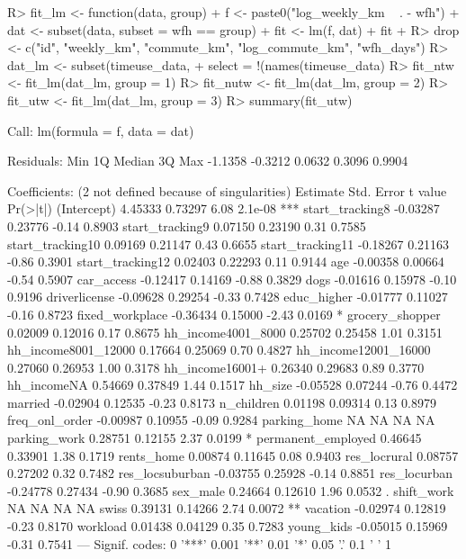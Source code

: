 \documentclass[%
    twoside, openright, titlepage, numbers=noenddot,%
    cleardoublepage=empty,%
    abstract=false,%
    BCOR=5.5mm, paper=a5, fontsize=10pt,%
]{scrreprt}
\begin{document}
%
\begin{Schunk}
\begin{Sinput}
R> fit_lm <- function(data, group) {
+    f <- paste0("log_weekly_km ~ . - wfh")
+    dat <- subset(data, subset = wfh == group)
+    fit <- lm(f, dat)
+    fit
+  }
R> drop <- c("id", "weekly_km", "commute_km", "log_commute_km", "wfh_days")
R> dat_lm <- subset(timeuse_data,
+    select = !(names(timeuse_data) %in% drop) & !grepl("^isco_", names(timeuse_data)))
R> fit_ntw <- fit_lm(dat_lm, group = 1)
R> fit_nutw <- fit_lm(dat_lm, group = 2)
R> fit_utw <- fit_lm(dat_lm, group = 3)
R> summary(fit_utw)
\end{Sinput}
\begin{Soutput}
Call:
lm(formula = f, data = dat)

Residuals:
    Min      1Q  Median      3Q     Max 
-1.1358 -0.3212  0.0632  0.3096  0.9904 

Coefficients: (2 not defined because of singularities)
                     Estimate Std. Error t value Pr(>|t|)    
(Intercept)           4.45333    0.73297    6.08  2.1e-08 ***
start_tracking8      -0.03287    0.23776   -0.14   0.8903    
start_tracking9       0.07150    0.23190    0.31   0.7585    
start_tracking10      0.09169    0.21147    0.43   0.6655    
start_tracking11     -0.18267    0.21163   -0.86   0.3901    
start_tracking12      0.02403    0.22293    0.11   0.9144    
age                  -0.00358    0.00664   -0.54   0.5907    
car_access           -0.12417    0.14169   -0.88   0.3829    
dogs                 -0.01616    0.15978   -0.10   0.9196    
driverlicense        -0.09628    0.29254   -0.33   0.7428    
educ_higher          -0.01777    0.11027   -0.16   0.8723    
fixed_workplace      -0.36434    0.15000   -2.43   0.0169 *  
grocery_shopper       0.02009    0.12016    0.17   0.8675    
hh_income4001_8000    0.25702    0.25458    1.01   0.3151    
hh_income8001_12000   0.17664    0.25069    0.70   0.4827    
hh_income12001_16000  0.27060    0.26953    1.00   0.3178    
hh_income16001+       0.26340    0.29683    0.89   0.3770    
hh_incomeNA           0.54669    0.37849    1.44   0.1517    
hh_size              -0.05528    0.07244   -0.76   0.4472    
married              -0.02904    0.12535   -0.23   0.8173    
n_children            0.01198    0.09314    0.13   0.8979    
freq_onl_order       -0.00987    0.10955   -0.09   0.9284    
parking_home               NA         NA      NA       NA    
parking_work          0.28751    0.12155    2.37   0.0199 *  
permanent_employed    0.46645    0.33901    1.38   0.1719    
rents_home            0.00874    0.11645    0.08   0.9403    
res_locrural          0.08757    0.27202    0.32   0.7482    
res_locsuburban      -0.03755    0.25928   -0.14   0.8851    
res_locurban         -0.24778    0.27434   -0.90   0.3685    
sex_male              0.24664    0.12610    1.96   0.0532 .  
shift_work                 NA         NA      NA       NA    
swiss                 0.39131    0.14266    2.74   0.0072 ** 
vacation             -0.02974    0.12819   -0.23   0.8170    
workload              0.01438    0.04129    0.35   0.7283    
young_kids           -0.05015    0.15969   -0.31   0.7541    
---
Signif. codes:  0 '***' 0.001 '**' 0.01 '*' 0.05 '.' 0.1 ' ' 1


\end{Soutput}
\end{Schunk}
\end{document}
